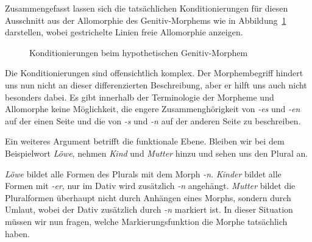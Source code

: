 Zusammengefasst lassen sich die tatsächlichen Konditionierungen für diesen Ausschnitt aus der Allomorphie des Genitiv-Morphems wie in Abbildung~\ref{fig:kondgensg} darstellen, wobei gestrichelte Linien freie Allomorphie anzeigen.

\begin{figure}[!h]
  \centering
  \caption{Konditionierungen beim hypothetischen Genitiv-Morphem}
  \label{fig:kondgensg}
\end{figure}

Die Konditionierungen sind offensichtlich komplex.
Der Morphembegriff hindert uns nun nicht an dieser differenzierten Beschreibung, aber er hilft uns auch nicht besonders dabei.
Es gibt innerhalb der Terminologie der Morpheme und Allomorphe keine Möglichkeit, die engere Zusammenghörigkeit von \textit{-es} und \textit{-en} auf der einen Seite und die von \textit{-s} und \textit{-n} auf der anderen Seite zu beschreiben.

Ein weiteres Argument betrifft die funktionale Ebene.
Bleiben wir bei dem Beispielwort \textit{Löwe}, nehmen \textit{Kind} und \textit{Mutter} hinzu und sehen uns den Plural an.

\begin{exe}
  \ex
  \begin{xlist}
  \end{xlist}
  \ex
  \begin{xlist}
  \end{xlist}
  \ex
  \begin{xlist}
  \end{xlist}
\end{exe}

\textit{Löwe} bildet alle Formen des Plurals mit dem Morph \textit{-n}.
\textit{Kinder} bildet alle Formen mit \textit{-er}, nur im Dativ wird zusätzlich \textit{-n} angehängt.
\textit{Mutter} bildet die Pluralformen überhaupt nicht durch Anhängen eines Morphs, sondern durch Umlaut, wobei der Dativ zusätzlich durch \textit{-n} markiert ist.
In dieser Situation müssen wir nun fragen, welche Markierungsfunktion die Morphe tatsächlich haben.

